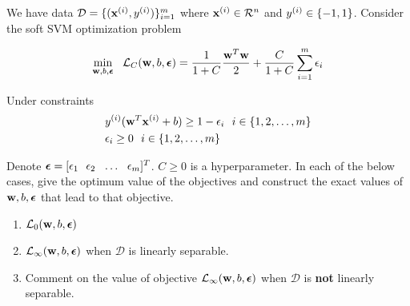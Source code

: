 We have data $\mathcal{D} = \{(\mathbf{x}^{(i)}, y^{(i)})\}_{i = 1}^{m}$ where $\mathbf{x}^{(i)} \in \mathcal{R}^{n}$ and  $y^{(i)} \in \{-1, 1\}$. Consider the soft SVM optimization problem

\begin{equation*}
\minbelow{\wb, b, \beps}  \ \ \loss_C(\wb, b, \beps) =  \frac{1}{1 + C} \frac{\wb^T\wb}{2} + \frac{C}{1 + C} \sum_{i = 1}^{m} \epsilon_i
\end{equation*}

Under constraints 
\begin{align*}
&y^{(i)}(\mathbf{w}^T \mathbf{x}^{(i)} + b) \geq 1 - \epsilon_i \ \ i \in \{1, 2, \dots, m\}\\
&\epsilon_i \geq 0  \ \ i \in \{1, 2, \dots, m\}
\end{align*}

Denote \(\boldsymbol{\epsilon} = [\epsilon_1 \ \  \epsilon_2 \ \  \dots \ \  \epsilon_m]^T\). \(C \geq 0\) is a hyperparameter.
In each of the below cases, give the optimum value of the objectives and construct the exact values of $\mathbf{w}, b, \boldsymbol{\epsilon}$ that lead to that objective.
\begin{enumerate}[label=\alph*)]
\item $\mathcal{L}_0(\mathbf{w}, b, \boldsymbol{\epsilon})$
\item $\mathcal{L}_{\infty}(\mathbf{w}, b, \boldsymbol{\epsilon})$ when $\mathcal{D}$ is linearly separable.
\item Comment on the value of objective $\mathcal{L}_{\infty}(\mathbf{w}, b, \boldsymbol{\epsilon})$ when $\mathcal{D}$ is \textbf{not} linearly separable.
\end{enumerate}



